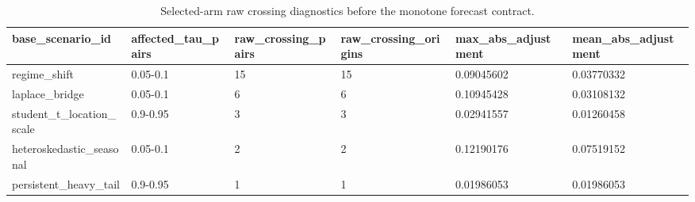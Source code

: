\begin{table}[t]
\centering
\small
\begin{tabular}{@{}llllll@{}}
\toprule
base\_scenario\_id & affected\_tau\_pairs & raw\_crossing\_pairs & raw\_crossing\_origins & max\_abs\_adjustment & mean\_abs\_adjustment
\\
\midrule
regime\_shift & 0.05-0.1 & 15 & 15 & 0.09045602 & 0.03770332 \\
laplace\_bridge & 0.05-0.1 &  6 &  6 & 0.10945428 & 0.03108132 \\
student\_t\_location\_scale & 0.9-0.95 &  3 &  3 & 0.02941557 & 0.01260458 \\
heteroskedastic\_seasonal & 0.05-0.1 &  2 &  2 & 0.12190176 & 0.07519152 \\
persistent\_heavy\_tail & 0.9-0.95 &  1 &  1 & 0.01986053 & 0.01986053 \\
\bottomrule
\end{tabular}
\caption{Selected-arm raw crossing diagnostics before the monotone forecast contract.}
\label{tab:joint-qvp-phase4k-crossing-diagnostics}
\end{table}

